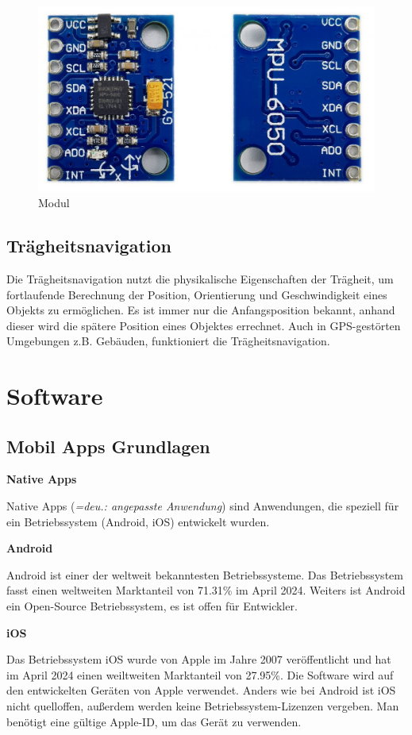 \begin{figure}[H]
	\centering
	\includegraphics[width=0.7\linewidth]{images/Modul.jpg}
	\caption[Modul]{Modul}
	\label{fig:Modul}
\end{figure}

\subsection{Trägheitsnavigation}

Die Trägheitsnavigation nutzt die physikalische Eigenschaften der Trägheit, um fortlaufende Berechnung der Position, Orientierung und Geschwindigkeit eines Objekts zu ermöglichen. \parencite{Traegheitsnavigation} Es ist immer nur die Anfangsposition bekannt, anhand dieser wird die spätere Position eines Objektes errechnet. Auch in GPS-gestörten Umgebungen z.B. Gebäuden, funktioniert die Trägheitsnavigation. 


\section{Software}


\subsection{Mobil Apps Grundlagen}

\textbf{Native Apps}

Native Apps (\textit{=deu.: angepasste Anwendung}) sind Anwendungen, die speziell für ein Betriebssystem (Android, iOS) entwickelt wurden.

\textbf{Android}

Android ist einer der weltweit bekanntesten Betriebssysteme. Das Betriebssystem fasst einen weltweiten Marktanteil von 71.31\% im April 2024. \parencite{AndroidVsiOS} Weiters ist Android ein Open-Source Betriebssystem, es ist offen für Entwickler.  

\textbf{iOS}

Das Betriebssystem iOS wurde von Apple im Jahre 2007 veröffentlicht und hat im April 2024 einen weiltweiten Marktanteil von 27.95\%. \parencite{AndroidVsiOS} Die Software wird auf den entwickelten Geräten von Apple verwendet. Anders wie bei Android ist iOS nicht quelloffen, außerdem werden keine Betriebssystem-Lizenzen vergeben. Man benötigt eine gültige Apple-ID, um das Gerät zu verwenden.

